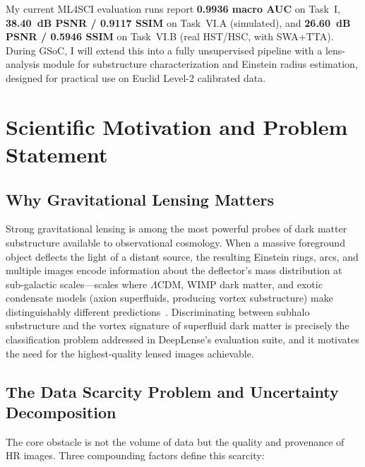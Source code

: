 \documentclass[11pt,a4paper]{article}
\begin{document}
My current ML4SCI evaluation runs report \textbf{0.9936 macro AUC} on Task~I, \textbf{38.40~dB PSNR / 0.9117 SSIM} on Task~VI.A (simulated), and \textbf{26.60~dB PSNR / 0.5946 SSIM} on Task~VI.B (real HST/HSC, with SWA+TTA). During GSoC, I will extend this into a fully unsupervised pipeline with a lens-analysis module for substructure characterization and Einstein radius estimation, designed for practical use on Euclid Level-2 calibrated data.

\vspace{6pt}

\section{Scientific Motivation and Problem Statement}

\subsection{Why Gravitational Lensing Matters}

Strong gravitational lensing is among the most powerful probes of dark matter substructure available to observational cosmology. When a massive foreground object deflects the light of a distant source, the resulting Einstein rings, arcs, and multiple images encode information about the deflector's mass distribution at sub-galactic scales---scales where $\Lambda$CDM, WIMP dark matter, and exotic condensate models (axion superfluids, producing vortex substructure) make distinguishably different predictions~\citep{alexander2019,alexander2021}. Discriminating between subhalo substructure and the vortex signature of superfluid dark matter is precisely the classification problem addressed in DeepLense's evaluation suite, and it motivates the need for the highest-quality lensed images achievable.

\subsection{The Data Scarcity Problem and Uncertainty Decomposition}

The core obstacle is not the volume of data but the quality and provenance of HR images. Three compounding factors define this scarcity:
\end{document}
